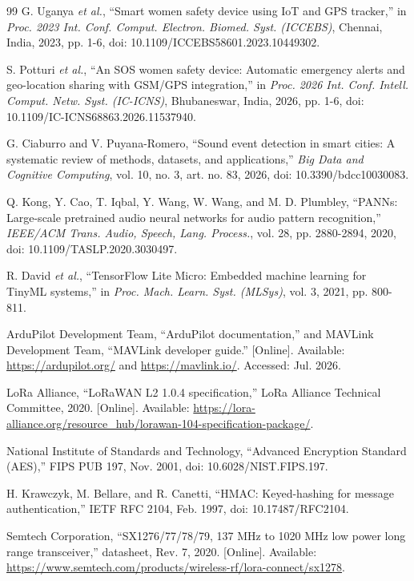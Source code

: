 \documentclass[journal]{IEEEtran}
\begin{document}
\begin{thebibliography}{99}
G. Uganya \emph{et al.}, ``Smart women safety device using IoT and GPS
tracker,'' in \emph{Proc. 2023 Int. Conf. Comput. Electron. Biomed. Syst.
(ICCEBS)}, Chennai, India, 2023, pp. 1-6, doi:
10.1109/ICCEBS58601.2023.10449302.

S. Potturi \emph{et al.}, ``An SOS women safety device: Automatic emergency
alerts and geo-location sharing with GSM/GPS integration,'' in \emph{Proc.
2026 Int. Conf. Intell. Comput. Netw. Syst. (IC-ICNS)}, Bhubaneswar, India,
2026, pp. 1-6, doi: 10.1109/IC-ICNS68863.2026.11537940.

G. Ciaburro and V. Puyana-Romero, ``Sound event detection in smart cities: A
systematic review of methods, datasets, and applications,'' \emph{Big Data
and Cognitive Computing}, vol. 10, no. 3, art. no. 83, 2026, doi:
10.3390/bdcc10030083.

Q. Kong, Y. Cao, T. Iqbal, Y. Wang, W. Wang, and M. D. Plumbley, ``PANNs:
Large-scale pretrained audio neural networks for audio pattern
recognition,'' \emph{IEEE/ACM Trans. Audio, Speech, Lang. Process.}, vol.
28, pp. 2880-2894, 2020, doi: 10.1109/TASLP.2020.3030497.

R. David \emph{et al.}, ``TensorFlow Lite Micro: Embedded machine learning
for TinyML systems,'' in \emph{Proc. Mach. Learn. Syst. (MLSys)}, vol. 3,
2021, pp. 800-811.

ArduPilot Development Team, ``ArduPilot documentation,'' and MAVLink
Development Team, ``MAVLink developer guide.'' [Online]. Available:
\url{https://ardupilot.org/} and \url{https://mavlink.io/}. Accessed: Jul.
2026.

LoRa Alliance, ``LoRaWAN L2 1.0.4 specification,'' LoRa Alliance Technical
Committee, 2020. [Online]. Available:
\url{https://lora-alliance.org/resource_hub/lorawan-104-specification-package/}.

National Institute of Standards and Technology, ``Advanced Encryption
Standard (AES),'' FIPS PUB 197, Nov. 2001, doi: 10.6028/NIST.FIPS.197.

H. Krawczyk, M. Bellare, and R. Canetti, ``HMAC: Keyed-hashing for message
authentication,'' IETF RFC 2104, Feb. 1997, doi: 10.17487/RFC2104.

Semtech Corporation, ``SX1276/77/78/79, 137 MHz to 1020 MHz low power
long range transceiver,'' datasheet, Rev. 7, 2020. [Online]. Available:
\url{https://www.semtech.com/products/wireless-rf/lora-connect/sx1278}.


\end{thebibliography}
\end{document}
